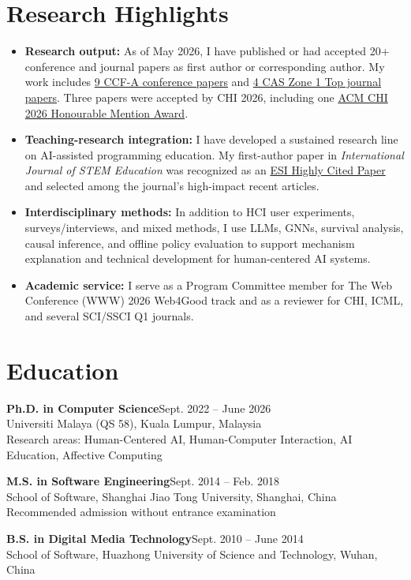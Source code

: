 \documentclass[a4paper,10pt]{article}
\newcommand{\cvlabel}[1]{\textbf{#1}}
\newcommand{\entry}[4]{\textbf{#1}\hfill #2\\#3\\\textcolor{cvgray}{#4}\vspace{0.15em}}
\begin{document}
\section*{Research Highlights}
\begin{itemize}
  \item \cvlabel{Research output:} As of May 2026, I have published or had accepted 20+ conference and journal papers as first author or corresponding author. My work includes \underline{9 CCF-A conference papers} and \underline{4 CAS Zone 1 Top journal papers}. Three papers were accepted by CHI 2026, including one \underline{ACM CHI 2026 Honourable Mention Award}.
  \item \cvlabel{Teaching-research integration:} I have developed a sustained research line on AI-assisted programming education. My first-author paper in \textit{International Journal of STEM Education} was recognized as an \underline{ESI Highly Cited Paper} and selected among the journal's high-impact recent articles.
  \item \cvlabel{Interdisciplinary methods:} In addition to HCI user experiments, surveys/interviews, and mixed methods, I use LLMs, GNNs, survival analysis, causal inference, and offline policy evaluation to support mechanism explanation and technical development for human-centered AI systems.
  \item \cvlabel{Academic service:} I serve as a Program Committee member for The Web Conference (WWW) 2026 Web4Good track and as a reviewer for CHI, ICML, and several SCI/SSCI Q1 journals.
\end{itemize}

\section*{Education}

\entry{Ph.D. in Computer Science}{Sept. 2022 -- June 2026}{Universiti Malaya (QS 58), Kuala Lumpur, Malaysia}{Research areas: Human-Centered AI, Human-Computer Interaction, AI Education, Affective Computing}

\entry{M.S. in Software Engineering}{Sept. 2014 -- Feb. 2018}{School of Software, Shanghai Jiao Tong University, Shanghai, China}{Recommended admission without entrance examination}

\entry{B.S. in Digital Media Technology}{Sept. 2010 -- June 2014}{School of Software, Huazhong University of Science and Technology, Wuhan, China}{}
\end{document}
